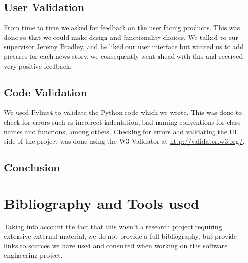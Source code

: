 \documentclass{report}
\begin{document}
	\section{User Validation}
	
	From time to time we asked for feedback on the user facing products. This was done so that we could make design and functionality choices. We talked to our supervisor Jeremy Bradley, and he liked our user interface but wanted us to add pictures for each news story, we consequently went ahead with this and received very positive feedback.
	
	\section{Code Validation}
	
	We used Pylint4 to validate the Python code which we wrote. This was done to check for errors such as incorrect indentation, bad naming conventions for class names and functions, among others. Checking for errors and validating the UI side of the project was done using the W3 Validator at \url{http://validator.w3.org/}.
	
	\section{Conclusion}
	
	
	
	
	
	\chapter{Bibliography and Tools used}\label{chap:bib}
	
	Taking into account the fact that this wasn't a research project requiring extensive external material, we do not provide a full bibliography, but provide links to sources we have used and consulted when working on this software engineering project.
	
\end{document}
